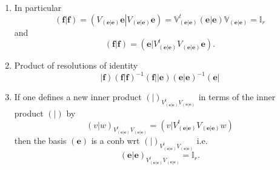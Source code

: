 \documentclass[aps,preprint]{revtex4}%
\begin{document}
\begin{enumerate}
\item In particular%
\begin{equation}
\left(  \left.  \mathbf{f}\right\vert \mathbf{f}\right)  =\left(  \left.
\overset{}{V_{\left(  \left.  \mathbf{e}\right\vert \mathbf{e}\right)
}\mathbf{e}}\right\vert V_{\left(  \left.  \mathbf{e}\right\vert
\mathbf{e}\right)  }\mathbf{e}\right)  =\mathbb{V}_{\left(  \left.
\mathbf{e}\right\vert \mathbf{e}\right)  }^{t}\left(  \left.
\overset{}{\mathbf{e}}\right\vert \mathbf{e}\right)  \mathbb{V}_{\left(
\left.  \mathbf{e}\right\vert \mathbf{e}\right)  }=\mathbb{I}_{r}%
\end{equation}
and
\begin{equation}
\left(  \left.  \mathbf{f}\right\vert \mathbf{f}\right)  =\left(  \left.
\overset{}{\mathbf{e}}\right\vert V_{\left(  \left.  \mathbf{e}\right\vert
\mathbf{e}\right)  }^{t}V_{\left(  \left.  \mathbf{e}\right\vert
\mathbf{e}\right)  }\mathbf{e}\right)  .
\end{equation}


\item Product of resolutions of identity%
\begin{equation}
\left\vert \mathbf{f}\right)  \left(  \left.  \mathbf{f}\right\vert
\mathbf{f}\right)  ^{-1}\left(  \mathbf{f}\right\vert \left\vert
\mathbf{e}\right)  \left(  \left.  \mathbf{e}\right\vert \mathbf{e}\right)
^{-1}\left(  \mathbf{e}\right\vert
\end{equation}


\item If one defines a new inner product $\left(  \left.  {}\right\vert
\right)  _{V_{\left(  \left.  \mathbf{e}\right\vert \mathbf{e}\right)  }%
^{t}V_{\left(  \left.  \mathbf{e}\right\vert \mathbf{e}\right)  }}$ in terms
of the inner product $\left(  \left.  {}\right\vert \right)  $ by
\begin{equation}
\left(  \left.  v\right\vert w\right)  _{V_{\left(  \left.  \mathbf{e}%
\right\vert \mathbf{e}\right)  }^{t}V_{\left(  \left.  \mathbf{e}\right\vert
\mathbf{e}\right)  }}=\left(  \left.  \overset{}{v}\right\vert V_{\left(
\left.  \mathbf{e}\right\vert \mathbf{e}\right)  }^{t}V_{\left(  \left.
\mathbf{e}\right\vert \mathbf{e}\right)  }w\right)
\end{equation}
then the basis $\left(  \mathbf{e}\right)  $ is a conb wrt $\left(  \left.
{}\right\vert \right)  _{V_{\left(  \left.  \mathbf{e}\right\vert
\mathbf{e}\right)  }^{t}V_{\left(  \left.  \mathbf{e}\right\vert
\mathbf{e}\right)  }}$ i.e.
\begin{equation}
\left(  \left.  \mathbf{e}\right\vert \mathbf{e}\right)  _{V_{\left(  \left.
\mathbf{e}\right\vert \mathbf{e}\right)  }^{t}V_{\left(  \left.
\mathbf{e}\right\vert \mathbf{e}\right)  }}=\mathbb{I}_{r}.
\end{equation}



\end{enumerate}
\end{document}
